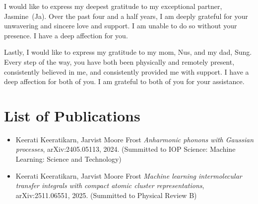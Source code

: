 I would like to express my deepest gratitude to my exceptional partner, Jasmine~(Ja).  Over the past four and a half years, I am deeply grateful for your unwavering and sincere love and support. I am unable to do so without your presence.  I have a deep affection for you.

Lastly, I would like to express my gratitude to my mom, Nus, and my dad, Sung.  Every step of the way, you have both been physically and remotely present, consistently believed in me, and consistently provided me with support.  I have a deep affection for both of you.  I am grateful to both of you for your assistance.

\newpage
\setcounter{tocdepth}{2}
\tableofcontents
\newpage
\thispagestyle{plain}
{}
\section*{\Huge List of Publications}
\begin{itemize}
    \item Keerati Keeratikarn, Jarvist Moore Frost
    \textit{Anharmonic phonons with Gaussian processes},
    arXiv:2405.05113, 2024. (Summitted to IOP Science: Machine Learning: Science and Technology)
    \item Keerati Keeratikarn, Jarvist Moore Frost
    \textit{Machine learning intermolecular transfer integrals with compact atomic cluster representations},\\ 
    arXiv:2511.06551, 2025. (Summitted to Physical Review B)
\end{itemize}
\newpage

\thispagestyle{plain}
{}
\listoffigures
\newpage
\thispagestyle{plain}
{}
\listoftables
\newpage


%
%

